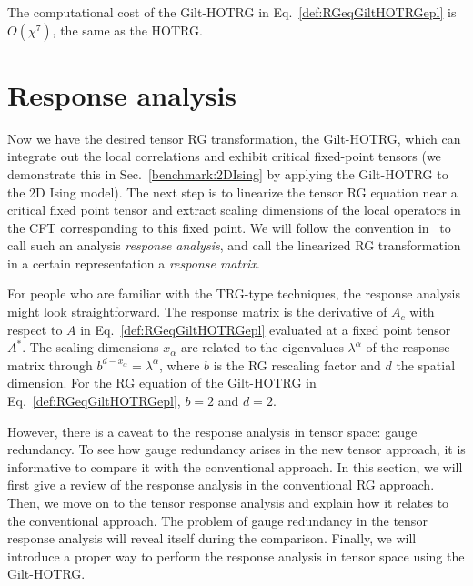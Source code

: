 \documentclass[aps,prb,reprint,superscriptaddress,floatfix]{revtex4-2}
\begin{document}
The computational cost of the Gilt-HOTRG in
Eq.~\eqref{def:RGeqGiltHOTRGepl} is $O(\chi^7)$, the same as the HOTRG.

\section{Response analysis\label{diffRGeq}}
Now we have the desired tensor RG transformation, the Gilt-HOTRG, which
can integrate out the local correlations and exhibit critical
fixed-point tensors (we demonstrate this in Sec.~\ref{benchmark:2DIsing}
by applying the Gilt-HOTRG to the 2D Ising model). The next step is to
linearize the tensor RG equation near a critical fixed point tensor and
extract scaling dimensions of the local operators in the CFT
corresponding to this fixed point. We will follow the convention
in~\cite{kadanoff2014} to call such an analysis \textit{response
analysis}, and call the linearized RG transformation in a certain
representation a \textit{response matrix}.
%

For people who are familiar with the TRG-type techniques, the response
analysis might look straightforward. The response matrix is the
derivative of $A_c$ with respect to $A$ in
Eq.~\eqref{def:RGeqGiltHOTRGepl} evaluated at a fixed point tensor
$A^{*}$. The scaling dimensions $x_{\alpha}$ are related to the eigenvalues
$\lambda^{\alpha}$ of the response matrix through $b^{d-x_{\alpha}} =
\lambda^{\alpha}$, where $b$ is the RG rescaling factor and $d$ the
spatial dimension. For the RG equation of the Gilt-HOTRG in
Eq.~\eqref{def:RGeqGiltHOTRGepl}, $b = 2$ and $d = 2$. 
%

However, there is a caveat to the response analysis in tensor space: gauge
redundancy. To see how gauge redundancy arises in the new tensor
approach, it is informative to compare it with the conventional
approach. In this section, we will first give a review of the response
analysis in the conventional RG approach. Then, we move on to the tensor
response analysis and explain how it relates to the conventional
approach. The problem of gauge redundancy in the tensor response analysis will
reveal itself during the comparison. Finally, we will introduce a
proper way to perform the response analysis in tensor space using
the Gilt-HOTRG.
%
\end{document}
